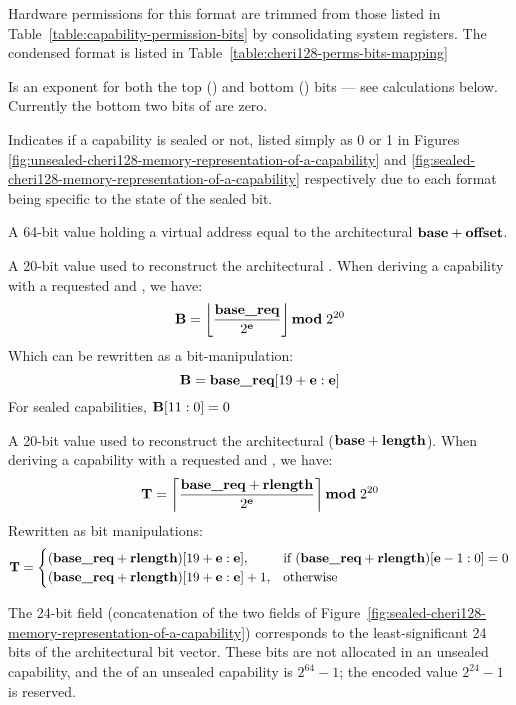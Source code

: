 \begin{description}[align=right, labelwidth=2em]
\item[\cmuperms{}]  Hardware permissions for this format are trimmed from those listed in Table~\ref{table:capability-permission-bits} by consolidating system registers. The condensed format is listed in Table~\ref{table:cheri128-perms-bits-mapping}

\item[\cexponent{}] Is an exponent for both the top (\cT{}) and bottom
  (\cB{}) bits --- see calculations below.  Currently the bottom two
  bits of \cexponent{} are zero.

\item[\csealed{}] Indicates if a capability is sealed or not, listed simply as 0 or 1 in Figures
\ref{fig:unsealed-cheri128-memory-representation-of-a-capability} and
\ref{fig:sealed-cheri128-memory-representation-of-a-capability} respectively
due to each format being specific to the state of the sealed bit.

\item[\caddr{}] A 64-bit value holding a virtual address equal to the
  architectural ${\bf base}{} + {\bf offset}{}$.

\item[\cB{}]
A 20-bit value used to reconstruct the architectural \cbase{}.
When deriving a capability with a requested \rbase{} and \rlength{}, we have:
\[{\bf B}{} = \left\lfloor \frac{\textbf{base\_req}{}}{2^{{\bf e}{}}} \right\rfloor
\mathbf{mod} \; 2^{20}\]
Which can be rewritten as a bit-manipulation:
\[\cB{} = \rbase{}[19+\cexponent{}:\cexponent{}]\hfill\]
For sealed capabilities, ${\bf B}{}[11:0] = 0$

\item[\cT{}]
A 20-bit value used to reconstruct the architectural \ctop{} (${\bf base}{}+{\bf length}{}$).
When deriving a capability with a requested \rbase{} and \rlength{}, we have:
\[{\bf T} = \left\lceil \frac{\textbf{base\_req}{} + \textbf{rlength}{}}{2^{{\bf e}{}}} \right\rceil \mathbf{mod} \; 2^{20}\]
Rewritten as bit manipulations:
\[
{\bf T}{} =\begin{cases}
(\textbf{base\_req}{} + \textbf{rlength}{})[19+{\bf e}{}:{\bf e}{}],& \text{if } (\textbf{base\_req}{} + \textbf{rlength}{})[{\bf e}{}-1:0] = 0\\
(\textbf{base\_req}{} + \textbf{rlength}{})[19+{\bf e}{}:{\bf e}{}] + 1,& \text{otherwise}
\end{cases}
\]
\item[\cotype{}]
The 24-bit \cotype{} field (concatenation of the two \cotype{} fields of Figure~\ref{fig:sealed-cheri128-memory-representation-of-a-capability}) corresponds to the least-significant 24 bits of the architectural \cotype{} bit vector.  These bits are not allocated in an unsealed capability, and the \cotype{} of an unsealed capability is $2^{64}-1$; the encoded value $2^{24}-1$ is reserved.

\end{description}

